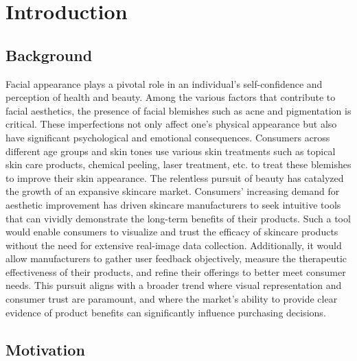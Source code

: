 
\chapter{Introduction}
\begin{spacing}{1.5}
\setlength{\parskip}{0.3in}

\section{Background}

Facial appearance plays a pivotal role in an individual's self-confidence and perception of health and beauty. Among the various factors that contribute to facial aesthetics, the presence of facial blemishes such as acne and pigmentation is critical. These imperfections not only affect one's physical appearance but also have significant psychological and emotional consequences.  Consumers across different age groups and skin tones use various skin treatments such as topical skin care products, chemical peeling, laser treatment, etc. to treat these blemishes to improve their skin appearance.
The relentless pursuit of beauty has catalyzed the growth of an expansive skincare market. Consumers' increasing demand for aesthetic improvement has driven skincare manufacturers to seek intuitive tools that can vividly demonstrate the long-term benefits of their products. Such a tool would enable consumers to visualize and trust the efficacy of skincare products without the need for extensive real-image data collection. Additionally, it would allow manufacturers to gather user feedback objectively, measure the therapeutic effectiveness of their products, and refine their offerings to better meet consumer needs. This pursuit aligns with a broader trend where visual representation and consumer trust are paramount, and where the market's ability to provide clear evidence of product benefits can significantly influence purchasing decisions.

\section{Motivation}


\end{spacing}
